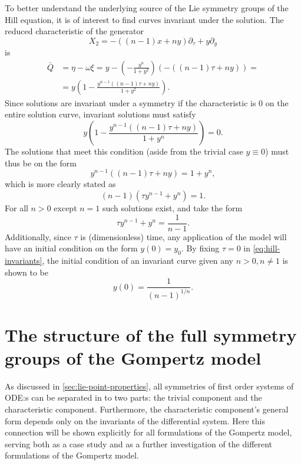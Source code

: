 To better understand the underlying source of the Lie symmetry groups of the Hill equation, it is of interest to find curves invariant under the solution.
The reduced characteristic of the generator
\begin{equation}
  X_2 = - \left( (n-1) x + n y \right) \partial_\tau + y \partial_y
\end{equation}
is
\begin{align}
  \bar{Q} &= 
  \eta - \omega \xi = 
  y - \left( -\frac{y^n}{1+y^2} \right) \left( - \left( (n-1) \tau + n y \right) \right) =\\
  &= y \left(1 -\frac{y^{n-1} \left( (n-1) \tau + n y \right)}{1+y^2} \right).
\end{align}
Since solutions are invariant under a symmetry if the characteristic is 0 on the entire solution curve, invariant solutions must satisfy
\begin{equation}
  y \left(1 -\frac{y^{n-1} \left( (n-1) \tau + n y \right)}{1+y^n} \right) = 0.
\end{equation}
The solutions that meet this condition (aside from the trivial case \(y \equiv 0\)) must thus be on the form
\begin{equation}
  y^{n-1} \left( (n-1) \tau + n y \right) = 1+y^n,
\end{equation}
which is more clearly stated as
\begin{equation}
  (n-1) \left( \tau y^{n-1} + y^n \right) = 1.
\end{equation}
For all \(n>0\) except \(n=1\) such solutions exist, and take the form
\begin{equation} \label{eq:hill-invariants}
  \tau y^{n-1} + y^n = \frac{1}{n-1}.
\end{equation}
Additionally, since \(\tau\) is (dimensionless) time, any application of the model will have an initial condition on the form \(y(0) = y_0\).
By fixing \(\tau=0\) in \cref{eq:hill-invariants}, the initial condition of an invariant curve given any \(n>0, n\neq1\) is shown to be
\begin{equation}
  y(0) =\frac{1}{(n-1)^{1/n}}.
\end{equation}

\section{The structure of the full symmetry groups of the Gompertz model}

As discussed in \cref{sec:lie-point-properties}, all symmetries of first order systems of ODE:s can be separated in to two parts: the trivial component and the characteristic component.
Furthermore, the characteristic component's general form depends only on the invariants of the differential system.
Here this connection will be shown explicitly for all formulations of the Gompertz model, serving both as a case study and as a further investigation of the different formulations of the Gompertz model.

